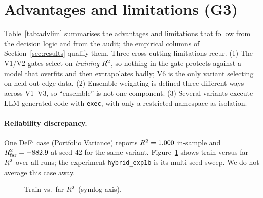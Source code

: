 \section{Advantages and limitations (G3)}\label{sec:discussion}
Table~\ref{tab:advlim} summarises the advantages and limitations that follow from the decision logic and from the audit; the empirical columns of Section~\ref{sec:results} qualify them. Three cross-cutting limitations recur. (1) The V1/V2 gates select on \emph{training} $R^2$, so nothing in the gate protects against a model that overfits and then extrapolates badly; V6 is the only variant selecting on held-out edge data. (2) Ensemble weighting is defined three different ways across V1--V3, so ``ensemble'' is not one component. (3) Several variants execute LLM-generated code with \texttt{exec}, with only a restricted namespace as isolation.
\begin{table}[t]\centering\scriptsize{}\caption{Advantages and limitations per variant.}\label{tab:advlim}\end{table}
\paragraph{Reliability discrepancy.} One DeFi case (Portfolio Variance) reports $R^2=1.000$ in-sample and $R^2_{\mathrm{far}}=-882.9$ at seed 42 for the same variant. Figure~\ref{fig:trainfar} shows train versus far $R^2$ over all runs; the experiment \texttt{hybrid\_exp1b} is its multi-seed sweep. We do not average this case away.
\begin{figure}[t]\centering{}\caption{Train vs.\ far $R^2$ (symlog axis).}\label{fig:trainfar}\end{figure}
